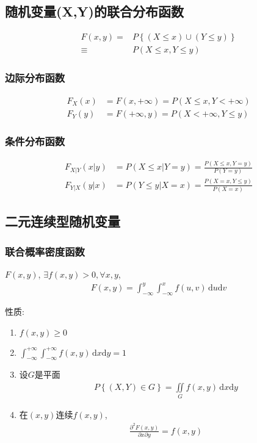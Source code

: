 \subsection{随机变量(X,Y)的联合分布函数}
\begin{align*}
    F(x,y)=&P\left\{(X\le x)\cup (Y\le y)\right\}\\
    \equiv&P(X\le x, Y\le y)
\end{align*}

\subsubsection{边际分布函数}
\begin{align*}
    F_X(x)&=F(x,+\infty)=P(X\le x,Y<+\infty)\\
    F_Y(y)&=F(+\infty,y)=P(X<+\infty,Y\le y)
\end{align*}

\subsubsection{条件分布函数}
\begin{align*}
    F_{X|Y}(x|y)&=P(X\le x|Y=y)=\frac{P(X\le x,Y=y)}{P(Y=y)}\\
    F_{Y|X}(y|x)&=P(Y\le y|X=x)=\frac{P(X=x,Y\le y)}{P(X=x)}
\end{align*}

\subsection{二元连续型随机变量}

\subsubsection{联合概率密度函数}
\begin{definition}
    $F(x,y)$, $\exists f(x,y)>0, \forall x,y$,
    \begin{align*}
        F(x,y)=\int_{-\infty}^{y}\int_{-\infty}^{x}f(u,v)\,\mathrm{d}u\mathrm{d}v
    \end{align*}
\end{definition}

性质:
\begin{enumerate}
    \item $f(x,y)\ge 0$
    \item $\int_{-\infty}^{+\infty}\int_{-\infty}^{+\infty}f(x,y)\,\mathrm{d}x\mathrm{d}y=1$
    \item 设$G$是平面
    \begin{align*}
        P\left\{(X,Y)\in G\right\}=\underset{G}{\iint} f(x,y)\,\mathrm{d}x\mathrm{d}y
    \end{align*}
    \item 在$(x,y)$连续$f(x,y)$, 
    \begin{align*}
        \frac{\partial^2 F(x,y)}{\partial x\partial y}=f(x,y)
    \end{align*}
\end{enumerate}

